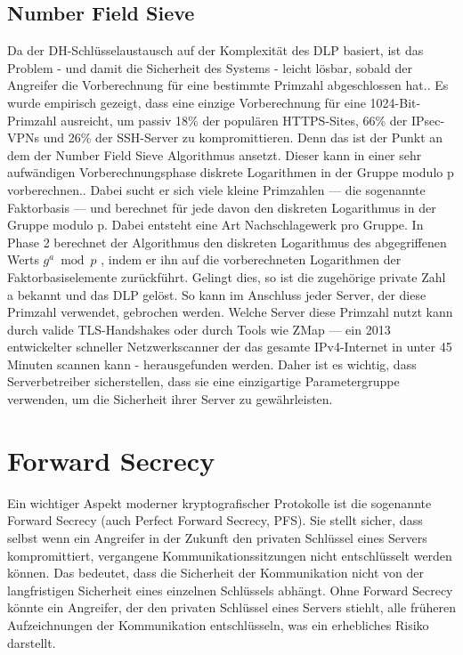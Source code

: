 \documentclass[conference]{IEEEtran}
\begin{document}
\subsection{Number Field Sieve}
Da der DH-Schlüsselaustausch auf der Komplexität des DLP basiert, ist das Problem - und damit die Sicherheit des Systems - leicht lösbar, sobald der Angreifer die Vorberechnung für eine bestimmte Primzahl abgeschlossen hat.. Es wurde empirisch gezeigt, dass eine einzige Vorberechnung für eine 1024-Bit-Primzahl ausreicht, um passiv 18\% der populären HTTPS-Sites, 66\% der IPsec-VPNs und 26\% der SSH-Server zu kompromittieren.\cite{logjam} Denn das ist der Punkt an dem der Number Field Sieve Algorithmus ansetzt. Dieser kann in einer sehr aufwändigen Vorberechnungsphase diskrete Logarithmen in der Gruppe modulo p vorberechnen.. Dabei sucht er sich viele kleine Primzahlen — die sogenannte Faktorbasis — und berechnet für jede davon den diskreten Logarithmus in der Gruppe modulo p. Dabei entsteht eine Art Nachschlagewerk pro Gruppe. In Phase 2 berechnet der Algorithmus den diskreten Logarithmus des abgegriffenen Werts $g^a \bmod p$
, indem er ihn auf die vorberechneten Logarithmen der Faktorbasiselemente zurückführt. Gelingt dies, so ist die zugehörige private Zahl a bekannt und das DLP gelöst.\cite{logjam} So kann im Anschluss jeder Server, der diese Primzahl verwendet, gebrochen werden. Welche Server diese Primzahl nutzt kann durch valide TLS-Handshakes oder durch Tools wie ZMap — ein 2013 entwickelter schneller Netzwerkscanner der das gesamte IPv4-Internet in unter 45 Minuten scannen kann\cite{zmap} - herausgefunden werden.  Daher ist es wichtig, dass Serverbetreiber sicherstellen, dass sie eine einzigartige Parametergruppe verwenden, um die Sicherheit ihrer Server zu gewährleisten.
\section{Forward Secrecy}
Ein wichtiger Aspekt moderner kryptografischer Protokolle ist die sogenannte Forward Secrecy (auch Perfect Forward Secrecy, PFS). Sie stellt sicher, dass selbst wenn ein Angreifer in der Zukunft den privaten Schlüssel eines Servers kompromittiert, vergangene Kommunikationssitzungen nicht entschlüsselt werden können. \cite[§1.2]{rfc8446}\cite{rfc4949} Das bedeutet, dass die Sicherheit der Kommunikation nicht von der langfristigen Sicherheit eines einzelnen Schlüssels abhängt. Ohne Forward Secrecy könnte ein Angreifer, der den privaten Schlüssel eines Servers stiehlt, alle früheren Aufzeichnungen der Kommunikation entschlüsseln, was ein erhebliches Risiko darstellt.
\\
\end{document}
